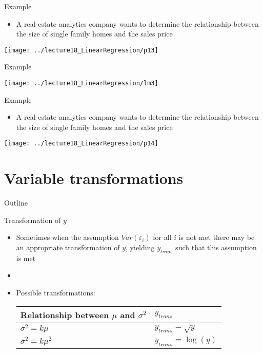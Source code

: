 \documentclass[xcolor=dvipsnames]{beamer}
\begin{document}
\begin{frame}{Example}
	\begin{itemize}
		\item A real estate analytics company wants to determine the relationship between the size of single family homes and the sales price
	\end{itemize}
	\begin{center}
		\texttt{[image: ../lecture18\_LinearRegression/p13]}
	\end{center}
\end{frame}

\begin{frame}{Example}
	\begin{center}
		\texttt{[image: ../lecture18\_LinearRegression/lm3]}
	\end{center}
\end{frame}

\begin{frame}{Example}
	\begin{itemize}
		\item A real estate analytics company wants to determine the relationship between the size of single family homes and the sales price
	\end{itemize}
	\begin{center}
		\texttt{[image: ../lecture18\_LinearRegression/p14]}
	\end{center}
\end{frame}

\section{Variable transformations}
\begin{frame}{Outline}
	\tableofcontents[currentsection,subsectionstyle=show/shaded/hide]
\end{frame}

\begin{frame}{Transformation of $y$}
	\begin{itemize}
		\item Sometimes when the assumption $Var(\varepsilon_i)$ for all $i$ is not met there may be an appropriate transformation of $y$, yielding $y_{trans}$ such that this assumption is met \pause
		\item[]
		\item Possible transformations: \pause
		\begin{center}
			\begin{tabular}{p{6cm}p{4cm}}
				\textbf{Relationship between $\mu$ and $\sigma^2$} & $y_{trans}$ \\ \hline
				$\sigma^2 = k\mu $ & $y_{trans} = \sqrt{y}$ \\
				$\sigma^2 = k\mu^2 $ & $y_{trans} = \log(y)$ \\ \hline
			\end{tabular}
		\end{center}
	\end{itemize}
\end{frame}
\end{document}
